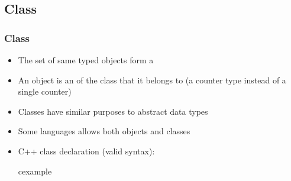 \subsection{Class}
\begin{frame}
 \frametitle{Class}
\begin{itemize}
 \item The set of same typed objects form a 
 \item An object is an  of the class that it belongs to (a counter type
 instead of a single counter)
 \item Classes have similar purposes to abstract data types
 \item Some languages allows both objects and classes
 \item C++ class declaration (valid syntax):
\begin{beamercolorbox}{cexample}
\codeclasscpp
\end{beamercolorbox}
\end{itemize}
\end{frame}

